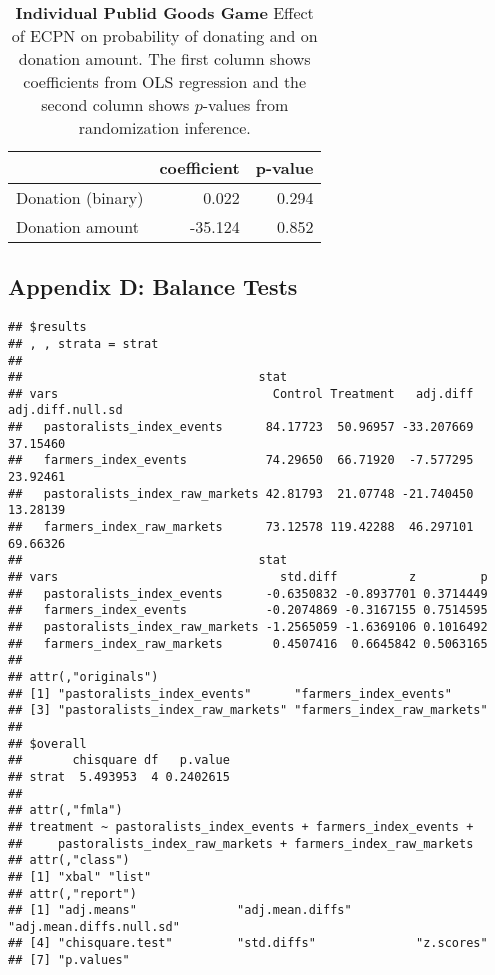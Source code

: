 \documentclass[
]{article}
\begin{document}
\begin{table}[H]
\begin{center}
\label{tab:pgg_tab_ind}
\caption{\textbf{Individual Publid Goods Game} Effect of ECPN on probability of donating and on donation amount. The first column shows coefficients from OLS regression and the second column shows $p$-values from randomization inference.}
\smallskip

\begin{tabular}{l|r|r}
\hline
  & coefficient & p-value\\
\hline
Donation (binary) & 0.022 & 0.294\\
\hline
Donation amount & -35.124 & 0.852\\
\hline
\end{tabular}


\end{center}
\end{table}

\hypertarget{appendix-d-balance-tests}{%
\subsection{Appendix D: Balance Tests}\label{appendix-d-balance-tests}}

\begin{verbatim}
## $results
## , , strata = strat
## 
##                                 stat
## vars                              Control Treatment   adj.diff adj.diff.null.sd
##   pastoralists_index_events      84.17723  50.96957 -33.207669         37.15460
##   farmers_index_events           74.29650  66.71920  -7.577295         23.92461
##   pastoralists_index_raw_markets 42.81793  21.07748 -21.740450         13.28139
##   farmers_index_raw_markets      73.12578 119.42288  46.297101         69.66326
##                                 stat
## vars                               std.diff          z         p
##   pastoralists_index_events      -0.6350832 -0.8937701 0.3714449
##   farmers_index_events           -0.2074869 -0.3167155 0.7514595
##   pastoralists_index_raw_markets -1.2565059 -1.6369106 0.1016492
##   farmers_index_raw_markets       0.4507416  0.6645842 0.5063165
## 
## attr(,"originals")
## [1] "pastoralists_index_events"      "farmers_index_events"          
## [3] "pastoralists_index_raw_markets" "farmers_index_raw_markets"     
## 
## $overall
##       chisquare df   p.value
## strat  5.493953  4 0.2402615
## 
## attr(,"fmla")
## treatment ~ pastoralists_index_events + farmers_index_events + 
##     pastoralists_index_raw_markets + farmers_index_raw_markets
## attr(,"class")
## [1] "xbal" "list"
## attr(,"report")
## [1] "adj.means"              "adj.mean.diffs"         "adj.mean.diffs.null.sd"
## [4] "chisquare.test"         "std.diffs"              "z.scores"              
## [7] "p.values"
\end{verbatim}
\end{document}
